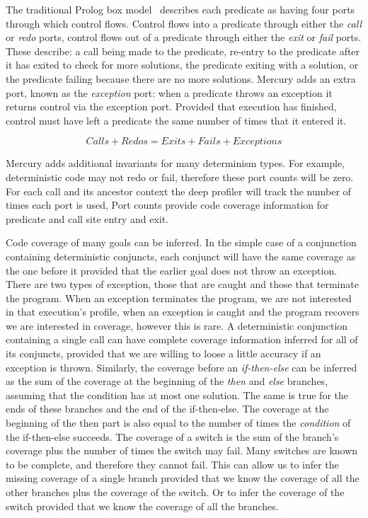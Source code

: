 The traditional Prolog box
model~\citep{box-model} describes each predicate
as having four ports through which control flows.
Control flows into a predicate through either the \emph{call} or
\emph{redo} ports,
control flows out of a predicate through either the \emph{exit} or
\emph{fail} ports.
These describe:
    a call being made to the predicate,
    re-entry to the predicate after it has exited to check for more
        solutions,
    the predicate exiting with a solution,
    or the predicate failing because there are no more solutions.
Mercury adds an extra port,
known as the \emph{exception} port:
when a predicate throws an exception it returns control via the exception
port.
Provided that execution has finished,
control must have left a predicate the same number of times that it entered
it.

\begin{equation*}
Calls + Redos = Exits + Fails + Exceptions
\end{equation*}

\noindent
Mercury adds additional invariants for many determinism types.
For example, deterministic code may not redo or fail,
therefore these port counts will be zero.
For each call and its ancestor context the
deep profiler will track the number of times each port is used,
Port counts provide code coverage information for predicate and call site
entry and exit.

Code coverage of many goals can be inferred.
In the simple case of a conjunction containing deterministic conjuncts,
each conjunct will have the same coverage as the one before it provided
that the earlier goal does not throw an exception.
There are two types of exception,
those that are caught and those that terminate the program.
When an exception terminates the program, we are not interested in that
execution's profile,
when an exception is caught and the program recovers we are interested in
coverage, however this is rare.
A deterministic conjunction containing a single call
can have complete coverage information inferred for all of its conjuncts,
provided that we are willing to loose a little accuracy if an exception is
thrown.
Similarly,
the coverage before an \emph{if-then-else} can be inferred as the sum
of the coverage at the beginning of the \emph{then} and \emph{else}
branches,
assuming that the condition has at most one solution.
The same is true for the ends of these branches and the end of the
if-then-else.
The coverage at the beginning of the then part is also equal to the
number of times the \emph{condition} of the if-then-else succeeds.
The coverage of a switch is the sum of the branch's coverage plus the number
of times the switch may fail.
Many switches are known to be complete, and therefore they cannot fail.
This can allow us to infer the missing coverage of a single branch provided
that we know the coverage of all the other branches plus the coverage of the
switch.
Or to infer the coverage of the switch provided that we know the coverage of
all the branches.

